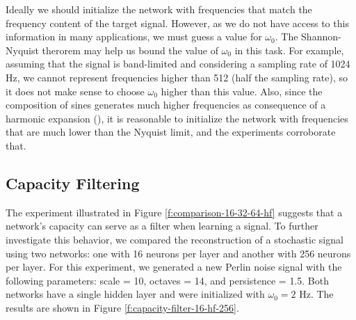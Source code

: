 Ideally we should initialize the network with frequencies that match the frequency content of the target signal. However, as we do not have access to this information in many applications, we must guess a value for $\omega_0$. The Shannon-Nyquist therorem may help us bound the value of $\omega_0$ in this task. For example, assuming that the signal is band-limited and considering a sampling rate of 1024 Hz, we cannot represent frequencies higher than 512 (half the sampling rate), so it does not make sense to choose $\omega_0$ higher than this value. Also, since the composition of sines generates much higher frequencies as consequence of a harmonic expansion (\cite{novello2022understanding}), it is reasonable to initialize the network with frequencies that are much lower than the Nyquist limit, and the experiments corroborate that.


\pagebreak

\subsection{Capacity Filtering}

The experiment illustrated in Figure \ref{f:comparison-16-32-64-hf} suggests that a network's capacity can serve as a filter when learning a signal. To further investigate this behavior, we compared the reconstruction of a stochastic signal using two networks: one with 16 neurons per layer and another with 256 neurons per layer. For this experiment, we generated a new Perlin noise signal with the following parameters: scale = 10, octaves = 14, and persistence = 1.5. Both networks have a single hidden layer and were initialized with $\omega_0=2$ Hz. The results are shown in Figure \ref{f:capacity-filter-16-hf-256}. 

